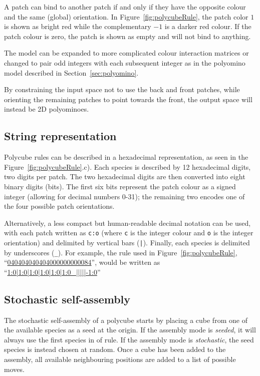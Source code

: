 A patch can bind to another patch if and only if they have the opposite colour and the same (global) orientation. In Figure~\ref{fig:polycubeRule}, the patch color \(1\) is shown as bright red while the complementary \(-1\) is a darker red colour.  If the patch colour is zero, the patch is shown as empty and will not bind to anything.

The model can be expanded to more complicated colour interaction matrices or changed to pair odd integers with each subsequent integer as in the polyomino model \cite{ahnert2010self,johnston2011evolutionary} described in Section~\ref{sec:polyomino}.

By constraining the input space not to use the back and front patches, while orienting the remaining patches to point towards the front, the output space will instead be 2D polyominoes.

\subsection{String representation}

Polycube rules can be described in a hexadecimal representation, as seen in the Figure~\ref{fig:polycubeRule}.c). Each species is described by 12 hexadecimal digits, two digits per patch. The two hexadecimal digits are then converted into eight binary digits (bits). The first six bits represent the patch colour as a signed integer (allowing for decimal numbers 0-31); the remaining two encodes one of the four possible patch orientations.

Alternatively, a less compact but human-readable decimal notation can be used, with each patch written as \texttt{c:o} (where \texttt{c} is the integer colour and \texttt{o} is the integer orientation) and delimited by vertical bars (\texttt{|}). Finally, each species is delimited by underscores (\texttt{\_}). For example, the rule used in Figure~\ref{fig:polycubeRule}, ``\href{https://akodiat.github.io/polycubes?rule=040404040404000000000084}{040404040404000000000084}'', would be written as ``\href{https://akodiat.github.io/polycubes?decRule=1:0|1:0|1:0|1:0|1:0|1:0_|||||-1:0}{1:0|1:0|1:0|1:0|1:0|1:0\_|||||-1:0}''

\subsection{Stochastic self-assembly}

The stochastic self-assembly of a polycube starts by placing a cube from one of the available species as a seed at the origin. If the assembly mode is \emph{seeded}, it will always use the first species in of rule. If the assembly mode is \emph{stochastic}, the seed species is instead chosen at random. Once a cube has been added to the assembly, all available neighbouring positions are added to a list of possible moves.

